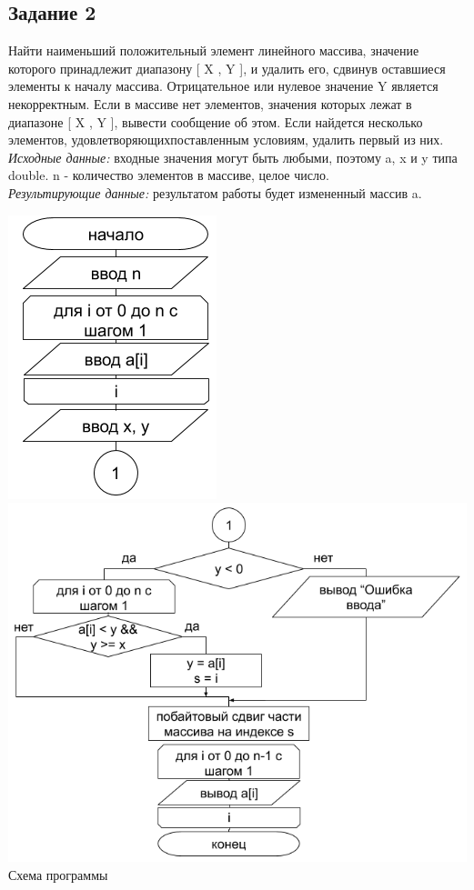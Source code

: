 \documentclass[a4paper,14pt]{extarticle}
\begin{document}
\subsection{Задание 2}
Найти наименьший положительный элемент линейного массива, значение которого принадлежит диапазону [ X , Y ], и удалить его, сдвинув оставшиеся элементы к началу массива. Отрицательное или нулевое значение Y является некорректным. Если в массиве нет элементов, значения которых лежат в диапазоне [ X , Y ], вывести сообщение об этом. Если найдется несколько элементов, удовлетворяющихпоставленным условиям, удалить первый из них.\\
\textit{Исходные данные:} входные значения могут быть любыми, поэтому a, x и y типа double. n - количество элементов в массиве, целое число.\\
\textit{Результирующие данные:} результатом работы будет измененный массив a.\\
\begin{center}
\includegraphics[scale=0.6]{lab4-2-1.png}\\
\includegraphics[scale=0.6]{lab4-2-2.png}\\
Схема программы
\end{center}
\end{document}
